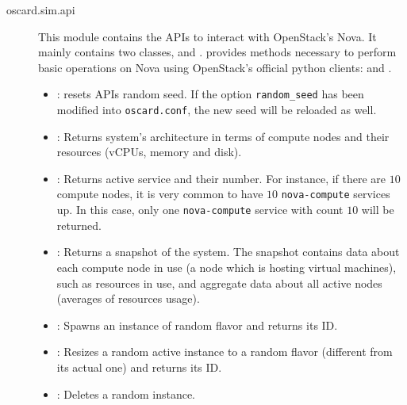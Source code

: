 \begin{description}
	\item[oscard.sim.api] This module contains the APIs to interact with OpenStack's Nova.
	It mainly contains two classes,  and .  provides methods necessary to perform basic operations on Nova using OpenStack's official python clients:  and .

		\begin{itemize}
			\item {}: resets APIs random seed. If the option \texttt{random\_seed} has been modified into \texttt{oscard.conf}, the new seed will be reloaded as well.
			\item {}: Returns system's architecture in terms of compute nodes and their resources (vCPUs, memory and disk).
			\item {}: Returns active service and their number. For instance, if there are $10$ compute nodes, it is very common to have $10$ \texttt{nova-compute} services up. In this case, only one \texttt{nova-compute} service with count $10$ will be returned.
			\item {}: Returns a snapshot of the system. The snapshot contains data about each compute node in use (a node which is hosting virtual machines), such as resources in use, and aggregate data about all active nodes (averages of resources usage). 
			\item {}: Spawns an instance of random flavor and returns its ID.
			\item {}: Resizes a random active instance to a random flavor (different from its actual one) and returns its ID.
			\item {}: Deletes a random instance.
		\end{itemize}


\end{description}
